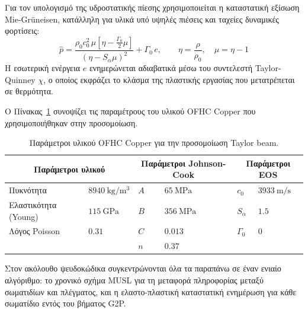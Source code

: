 \documentclass[12pt,a4paper]{report}
\begin{document}
	Για τον υπολογισμό της υδροστατικής πίεσης χρησιμοποιείται η καταστατική εξίσωση Mie-Grüneisen, κατάλληλη για υλικά υπό υψηλές πιέσεις και ταχείες δυναμικές φορτίσεις:
	\[
		\hat{p} = \frac{\rho_0 c_0^2\,\mu\!\left[\eta - \tfrac{\Gamma_0}{2}\mu\right]}{(\eta - S_\alpha\mu)^2} + \Gamma_0\, e, \qquad \eta = \frac{\rho}{\rho_0},\quad \mu = \eta - 1
	\]
	Η εσωτερική ενέργεια $e$ ενημερώνεται αδιαβατικά μέσω του συντελεστή Taylor-Quinney $\chi$, ο οποίος εκφράζει το κλάσμα της πλαστικής εργασίας που μετατρέπεται σε θερμότητα.

	Ο Πίνακας~\ref{tab:material} συνοψίζει τις παραμέτρους του υλικού OFHC Copper που χρησιμοποιήθηκαν στην προσομοίωση.

	\begin{table}[H]
	\centering
	\begin{tabular}{ll|ll|ll}
	\toprule
	\multicolumn{2}{c|}{Παράμετροι υλικού} & \multicolumn{2}{c|}{Παράμετροι Johnson-Cook} & \multicolumn{2}{c}{Παράμετροι EOS} \\
	\midrule
	Πυκνότητα        & $8940\ \mathrm{kg/m^3}$ & $A$ & $65\ \mathrm{MPa}$   & $c_0$        & $3933\ \mathrm{m/s}$ \\
	Ελαστικότητα (Young)      & $115\ \mathrm{GPa}$     & $B$ & $356\ \mathrm{MPa}$  & $S_\alpha$   & $1.5$ \\
	Λόγος Poisson    & $0.31$                  & $C$ & $0.013$              & $\Gamma_0$   & $0$ \\
	                 &                         & $n$ & $0.37$               &              & \\
	\bottomrule
	\end{tabular}
	\caption{Παράμετροι υλικού OFHC Copper για την προσομοίωση Taylor beam.}
	\label{tab:material}
	\end{table}

	Στον ακόλουθο ψευδοκώδικα συγκεντρώνονται όλα τα παραπάνω σε έναν ενιαίο αλγόριθμο: το χρονικό σχήμα MUSL για τη μεταφορά πληροφορίας μεταξύ σωματιδίων και πλέγματος, και η ελαστο-πλαστική καταστατική ενημέρωση για κάθε σωματίδιο εντός του βήματος G2P.
\end{document}
